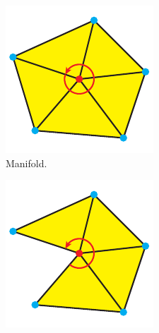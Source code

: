 \begin{description}
	\begin{figure}[H]
		\centering
		\begin{subfigure}[b]{0.3\textwidth}
			\centering
			\includegraphics[width=\textwidth]{images/closed_fan}
			\caption{
				Manifold.
			}
			\label{fig:closed_fan}
		\end{subfigure}
		\begin{subfigure}[b]{0.3\textwidth}
			\centering
			\includegraphics[width=\textwidth]{images/open_fan}

\end{subfigure}
\end{figure}
\end{description}
